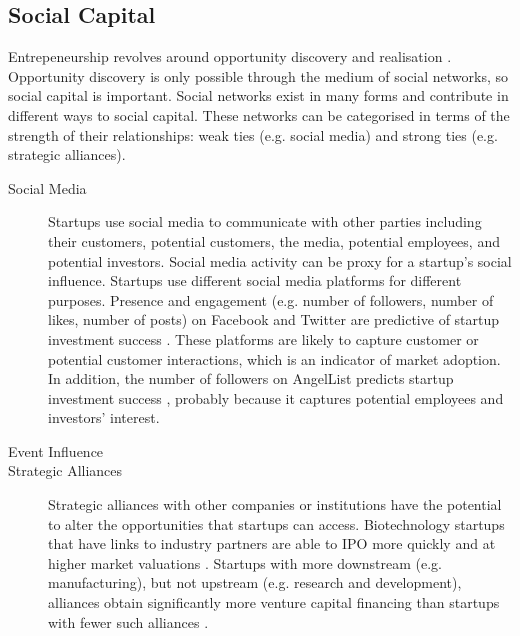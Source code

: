 \subsection{Social Capital}

Entrepeneurship revolves around opportunity discovery and realisation \cite{shane2000}. Opportunity discovery is only possible through the medium of social networks, so social capital is important. Social networks exist in many forms and contribute in different ways to social capital. These networks can be categorised in terms of the strength of their relationships: weak ties (e.g. social media) and strong ties (e.g. strategic alliances).

\begin{description}

\item[Social Media]

Startups use social media to communicate with other parties including their customers, potential customers, the media, potential employees, and potential investors. Social media activity can be proxy for a startup's social influence. Startups use different social media platforms for different purposes. Presence and engagement (e.g. number of followers, number of likes, number of posts) on Facebook and Twitter are predictive of startup investment success \cite{cheng2016,beckwith2016}. These platforms are likely to capture customer or potential customer interactions, which is an indicator of market adoption. In addition, the number of followers on AngelList predicts startup investment success \cite{an2015}, probably because it captures potential employees and investors' interest.

\item[Event Influence]


\item[Strategic Alliances]

Strategic alliances with other companies or institutions have the potential to alter the opportunities that startups can access. Biotechnology startups that have links to industry partners are able to IPO more quickly and at higher market valuations \cite{stuart1999}. Startups with more downstream (e.g. manufacturing), but not upstream (e.g. research and development), alliances obtain significantly more venture capital financing than startups with fewer such alliances \cite{baum2004}.

\end{description}

